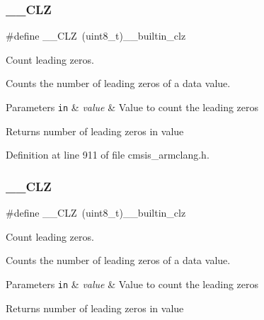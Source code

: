 \subsubsection{\texorpdfstring{\+\_\+\+\_\+\+C\+LZ}{\_\_CLZ}\hspace{0.1cm}{\footnotesize\ttfamily [2/3]}}
{\footnotesize\ttfamily \#define \+\_\+\+\_\+\+C\+LZ~(uint8\+\_\+t)\+\_\+\+\_\+builtin\+\_\+clz}



Count leading zeros. 

Counts the number of leading zeros of a data value. 
\begin{DoxyParams}[1]{Parameters}
\mbox{\tt in}  & {\em value} & Value to count the leading zeros \\
\hline
\end{DoxyParams}
\begin{DoxyReturn}{Returns}
number of leading zeros in value 
\end{DoxyReturn}


Definition at line 911 of file cmsis\+\_\+armclang.\+h.

\mbox{\label{group___c_m_s_i_s___core___instruction_interface_ga5d5bb1527e042be4a9fa5a33f65cc248}} 
\subsubsection{\texorpdfstring{\+\_\+\+\_\+\+C\+LZ}{\_\_CLZ}\hspace{0.1cm}{\footnotesize\ttfamily [3/3]}}
{\footnotesize\ttfamily \#define \+\_\+\+\_\+\+C\+LZ~(uint8\+\_\+t)\+\_\+\+\_\+builtin\+\_\+clz}



Count leading zeros. 

Counts the number of leading zeros of a data value. 
\begin{DoxyParams}[1]{Parameters}
\mbox{\tt in}  & {\em value} & Value to count the leading zeros \\
\hline
\end{DoxyParams}
\begin{DoxyReturn}{Returns}
number of leading zeros in value 
\end{DoxyReturn}


